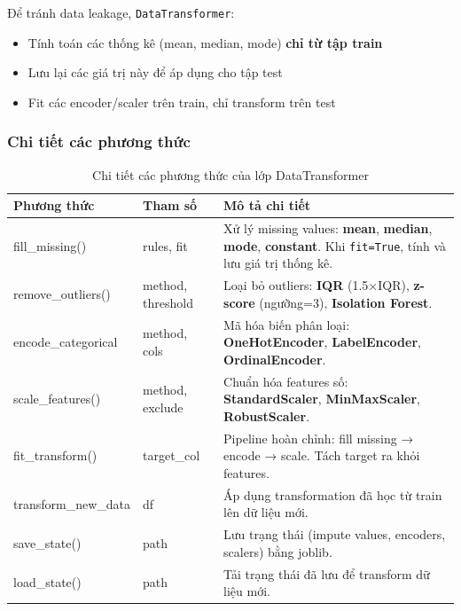 \documentclass[12pt,a4paper]{article}
\begin{document}
Để tránh data leakage, \texttt{DataTransformer}:
\begin{itemize}
    \item Tính toán các thống kê (mean, median, mode) \textbf{chỉ từ tập train}
    \item Lưu lại các giá trị này để áp dụng cho tập test
    \item Fit các encoder/scaler trên train, chỉ transform trên test
\end{itemize}

\subsubsection{Chi tiết các phương thức}

\begin{table}[H]
\centering
\caption{Chi tiết các phương thức của lớp DataTransformer}
\label{tab:datatransformer_methods}

\renewcommand{\arraystretch}{1.25}
\small %

\begin{tabular}{|>{\raggedright\arraybackslash\ttfamily}p{3.2cm}|
                >{\raggedright\arraybackslash}p{2.5cm}|
                >{\raggedright\arraybackslash}p{7.5cm}|}
\hline
\textbf{Phương thức} & \textbf{Tham số} & \textbf{Mô tả chi tiết} \\
\hline

fill\_missing() & rules, fit &
Xử lý missing values: \textbf{mean}, \textbf{median}, \textbf{mode}, \textbf{constant}. Khi \texttt{fit=True}, tính và lưu giá trị thống kê. \\
\hline

remove\_outliers() & method, threshold &
Loại bỏ outliers: \textbf{IQR} (1.5×IQR), \textbf{z-score} (ngưỡng=3), \textbf{Isolation Forest}. \\
\hline

encode\_categorical & method, cols &
Mã hóa biến phân loại: \textbf{OneHotEncoder}, \textbf{LabelEncoder}, \textbf{OrdinalEncoder}. \\
\hline

scale\_features() & method, exclude &
Chuẩn hóa features số: \textbf{StandardScaler}, \textbf{MinMaxScaler}, \textbf{RobustScaler}. \\
\hline

fit\_transform() & target\_col &
Pipeline hoàn chỉnh: fill missing → encode → scale. Tách target ra khỏi features. \\
\hline

transform\_new\_data & df &
Áp dụng transformation đã học từ train lên dữ liệu mới. \\
\hline

save\_state() & path &
Lưu trạng thái (impute values, encoders, scalers) bằng joblib. \\
\hline

load\_state() & path &
Tải trạng thái đã lưu để transform dữ liệu mới. \\
\hline

\end{tabular}
\end{table}
\end{document}
